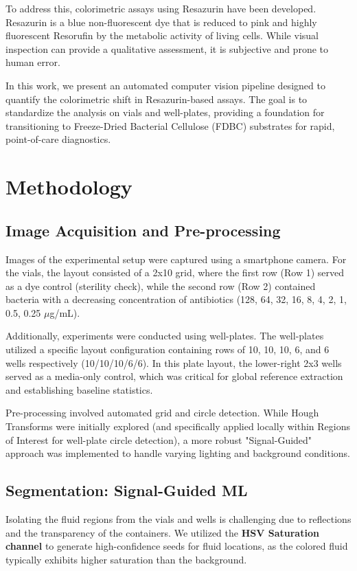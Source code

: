 \documentclass[conference]{IEEEtran}
\begin{document}
To address this, colorimetric assays using Resazurin have been developed. Resazurin is a blue non-fluorescent dye that is reduced to pink and highly fluorescent Resorufin by the metabolic activity of living cells. While visual inspection can provide a qualitative assessment, it is subjective and prone to human error.

In this work, we present an automated computer vision pipeline designed to quantify the colorimetric shift in Resazurin-based assays. The goal is to standardize the analysis on vials and well-plates, providing a foundation for transitioning to Freeze-Dried Bacterial Cellulose (FDBC) substrates for rapid, point-of-care diagnostics.

\section{Methodology}

\subsection{Image Acquisition and Pre-processing}
Images of the experimental setup were captured using a smartphone camera. For the vials, the layout consisted of a 2x10 grid, where the first row (Row 1) served as a dye control (sterility check), while the second row (Row 2) contained bacteria with a decreasing concentration of antibiotics (128, 64, 32, 16, 8, 4, 2, 1, 0.5, 0.25 $\mu$g/mL). 

Additionally, experiments were conducted using well-plates. The well-plates utilized a specific layout configuration containing rows of 10, 10, 10, 6, and 6 wells respectively (10/10/10/6/6). In this plate layout, the lower-right 2x3 wells served as a media-only control, which was critical for global reference extraction and establishing baseline statistics. 

Pre-processing involved automated grid and circle detection. While Hough Transforms were initially explored (and specifically applied locally within Regions of Interest for well-plate circle detection), a more robust "Signal-Guided" approach was implemented to handle varying lighting and background conditions.

\subsection{Segmentation: Signal-Guided ML}
Isolating the fluid regions from the vials and wells is challenging due to reflections and the transparency of the containers. We utilized the \textbf{HSV Saturation channel} to generate high-confidence seeds for fluid locations, as the colored fluid typically exhibits higher saturation than the background. 
\end{document}

